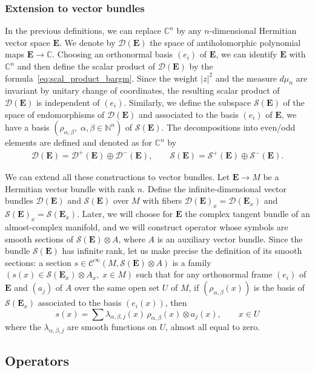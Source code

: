 \documentclass[10pt,a4paper]{article}
\theoremstyle{definition}
\numberwithin{equation}{section}
\newcommand{\N}{{\mathbb{N}}}
\newcommand{\C}{{\mathbb{C}}}
\newcommand{\be}{{\beta}}
\newcommand{\al}{{\alpha}}
\newcommand{\la}{{\lambda}}
\newcommand{\Ci}{{\mathcal{C}}^{\infty}}
\newcommand{\D}{\mathcal{D}}
\newcommand{\symb}{\mathcal{S}}
\newcommand{\EE}{\mathbf{E}}
\newcommand{\Uu}{\rho}
\begin{document}
\subsubsection{Extension to vector bundles}
In the previous definitions, we can replace $\C^n$ by any $n$-dimensional Hermitian vector space $\EE$. We denote by $\D (\EE)$ the space of antiholomorphic polynomial maps $\EE \rightarrow
\C$. Choosing an orthonormal basis $(e_i)$ of $\EE$, we can identify $\EE$ with $\C^n$ and then define the scalar product of $\D (\EE)$ by the formula~\eqref{eq:scal_product_bargm}. Since the weight $|z|^2$ and the measure $d
\mu_n$ are invariant by unitary change of coordinates, the resulting scalar product of $\D (\EE)$ is independent of $(e_i)$. Similarly, we define the subspace $\symb (\EE)$ of the space of endomorphisms of $\D (\EE)$ and associated to the basis $(e_i)$ of $\EE$, we have a basis $(\Uu_{\al,\be},\;
\al, \be \in \N^n)$ of $\symb (\EE)$. The decompositions into even/odd elements are defined and denoted as for $\C^n$ by
\begin{gather}
\D (\EE) = \D^+ (\EE) \oplus \D^{-} (\EE), \qquad \symb (\EE) = \symb ^{+} (\EE) \oplus
\symb^{-} (\EE).
\end{gather}

We can extend all these constructions to vector bundles. Let $\EE \rightarrow M$ be a Hermitian vector bundle with rank $n$. Define the infinite-dimensional vector bundles $\D (\EE)$ and $\symb (\EE)$ over $M$ with fibers $\D (\EE)_x = \D (\EE_x)$ and $\symb (\EE)_x = \symb (\EE_x)$. Later, we will choose for $\EE$ the complex tangent bundle of an almost-complex manifold, and we will construct operator whose symbols are smooth sections of $\symb (\EE) \otimes A$, where $A$ is an auxiliary vector bundle. Since the bundle $\symb(\EE)$ has infinite rank, let us make precise the definition of its smooth sections: a section $s \in \Ci (M,
\symb (\EE) \otimes A)$ is a family $(s(x) \in \symb (\EE_x) \otimes A_x, \; x \in M)$ such that for any orthonormal frame $(e_i)$ of $\EE$ and $(a_j)$ of $A$ over the same open set $U$ of $M$, if $(\Uu_{\al,
\be}(x))$ is the basis of $\symb (\EE_x)$ associated to the basis $(e_i(x))$, then
\[
s (x) = \sum \la_{\al,\be,j} (x) \, \Uu_{\al,\be} (x) \otimes a_j(x), \qquad
x \in U
\]
where the $\la_{\al, \be, j} $ are smooth functions on $U$, almost all equal to zero.


\subsection{Operators} \label{sec:operators}
\end{document}
